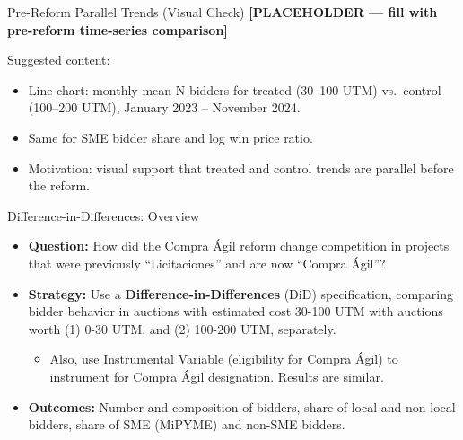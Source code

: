 \documentclass[10pt,aspectratio=169]{beamer}
\begin{document}
\begin{frame}{Pre-Reform Parallel Trends (Visual Check)}
\textbf{[PLACEHOLDER — fill with pre-reform time-series comparison]}

\medskip
Suggested content:
\begin{itemize}
  \item Line chart: monthly mean N bidders for treated (30–100 UTM) vs.\
        control (100–200 UTM), January 2023 – November 2024.
  \item Same for SME bidder share and log win price ratio.
  \item Motivation: visual support that treated and control trends
        are parallel before the reform.
\end{itemize}
\end{frame}


\begin{frame}{Difference-in-Differences: Overview}

  \begin{itemize}
    \item \textbf{Question:} How did the Compra Ágil reform change competition in projects that were previously ``Licitaciones'' and are now ``Compra Ágil''?
    \vspace{0.5cm}
    \item \textbf{Strategy:} Use a \textbf{Difference-in-Differences} (DiD) specification, comparing bidder behavior in auctions with estimated cost 30-100 UTM with auctions worth (1) 0-30 UTM, and (2) 100-200 UTM, separately.
    \begin{itemize}
      \item[-] Also, use Instrumental Variable (eligibility for Compra Ágil) to instrument for Compra Ágil designation. Results are similar. 
    \end{itemize}
    \vspace{0.5cm}
    \item \textbf{Outcomes:} Number and composition of bidders, share of local and non-local bidders, share of SME (MiPYME) and non-SME bidders.
  \end{itemize}
\end{frame}

\end{document}
